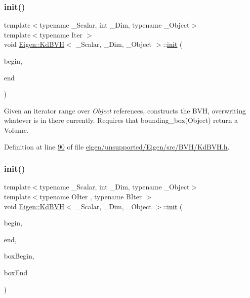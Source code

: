 \subsubsection{\texorpdfstring{init()}{init()}\hspace{0.1cm}{\footnotesize\ttfamily [2/4]}}
{\footnotesize\ttfamily template$<$typename \+\_\+\+Scalar, int \+\_\+\+Dim, typename \+\_\+\+Object$>$ \\
template$<$typename Iter $>$ \\
void \hyperlink{class_eigen_1_1_kd_b_v_h}{Eigen\+::\+Kd\+B\+VH}$<$ \+\_\+\+Scalar, \+\_\+\+Dim, \+\_\+\+Object $>$\+::\hyperlink{structinit}{init} (\begin{DoxyParamCaption}\item[{Iter}]{begin,  }\item[{Iter}]{end }\end{DoxyParamCaption})\hspace{0.3cm}{\ttfamily [inline]}}

Given an iterator range over {\itshape Object} references, constructs the B\+VH, overwriting whatever is in there currently. Requires that bounding\+\_\+box(\+Object) return a Volume. 

Definition at line \hyperlink{eigen_2unsupported_2_eigen_2src_2_b_v_h_2_kd_b_v_h_8h_source_l00090}{90} of file \hyperlink{eigen_2unsupported_2_eigen_2src_2_b_v_h_2_kd_b_v_h_8h_source}{eigen/unsupported/\+Eigen/src/\+B\+V\+H/\+Kd\+B\+V\+H.\+h}.

\mbox{\label{class_eigen_1_1_kd_b_v_h_a10a9c8f6d596d7a2cd285a3fb3e8c053}} 
\subsubsection{\texorpdfstring{init()}{init()}\hspace{0.1cm}{\footnotesize\ttfamily [3/4]}}
{\footnotesize\ttfamily template$<$typename \+\_\+\+Scalar, int \+\_\+\+Dim, typename \+\_\+\+Object$>$ \\
template$<$typename O\+Iter , typename B\+Iter $>$ \\
void \hyperlink{class_eigen_1_1_kd_b_v_h}{Eigen\+::\+Kd\+B\+VH}$<$ \+\_\+\+Scalar, \+\_\+\+Dim, \+\_\+\+Object $>$\+::\hyperlink{structinit}{init} (\begin{DoxyParamCaption}\item[{O\+Iter}]{begin,  }\item[{O\+Iter}]{end,  }\item[{B\+Iter}]{box\+Begin,  }\item[{B\+Iter}]{box\+End }\end{DoxyParamCaption})\hspace{0.3cm}{\ttfamily [inline]}}

